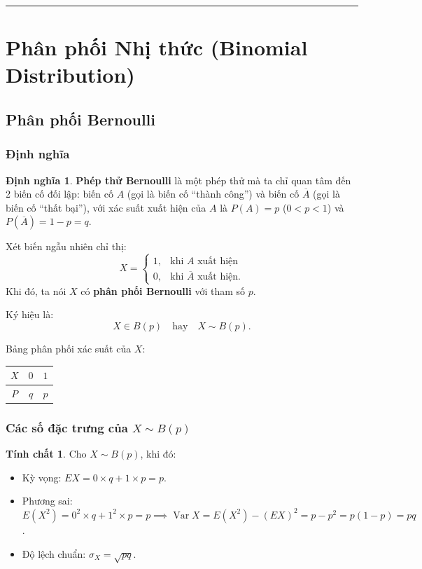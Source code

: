 \documentclass[12pt,a4paper]{article}
\theoremstyle{definition}
\newtheorem{dinhnghia}{Định nghĩa}[section]
\newtheorem{tinhchat}{Tính chất}[section]
\begin{document}
\vspace{1.5em}
\hrule
\vspace{1.5em}

\section{Phân phối Nhị thức (Binomial Distribution)}

\subsection{Phân phối Bernoulli}

\subsubsection{Định nghĩa}

\begin{dinhnghia}
\textbf{Phép thử Bernoulli} là một phép thử mà ta chỉ quan tâm đến 2 biến cố đối lập: biến cố $A$ (gọi là biến cố ``thành công'') và biến cố $\overline{A}$ (gọi là biến cố ``thất bại''), với xác suất xuất hiện của $A$ là $P(A) = p$ ($0 < p < 1$) và $P(\overline{A}) = 1 - p = q$.

Xét biến ngẫu nhiên chỉ thị:
\[
X = \begin{cases} 
1, & \text{khi } A \text{ xuất hiện} \\ 
0, & \text{khi } \overline{A} \text{ xuất hiện}. 
\end{cases}
\]
Khi đó, ta nói $X$ có \textbf{phân phối Bernoulli} với tham số $p$.

Ký hiệu là:
\[
X \in B(p) \quad \text{hay} \quad X \sim B(p).
\]

Bảng phân phối xác suất của $X$:
\begin{center}
\renewcommand{\arraystretch}{1.3}
\begin{tabular}{|c|c|c|}
\hline
$X$ & $0$ & $1$ \\
\hline
$P$ & $q$ & $p$ \\
\hline
\end{tabular}
\end{center}
\end{dinhnghia}

\subsubsection{Các số đặc trưng của \texorpdfstring{$X \sim B(p)$}{X ~ B(p)}}

\begin{tinhchat}
Cho $X \sim B(p)$, khi đó:
\begin{itemize}
    \item Kỳ vọng: $EX = 0 \times q + 1 \times p = p$.
    \item Phương sai: $E(X^2) = 0^2 \times q + 1^2 \times p = p \implies \operatorname{Var} X = E(X^2) - (EX)^2 = p - p^2 = p(1 - p) = pq$.
    \item Độ lệch chuẩn: $\sigma_X = \sqrt{pq}$.
\end{itemize}
\end{tinhchat}
\end{document}
